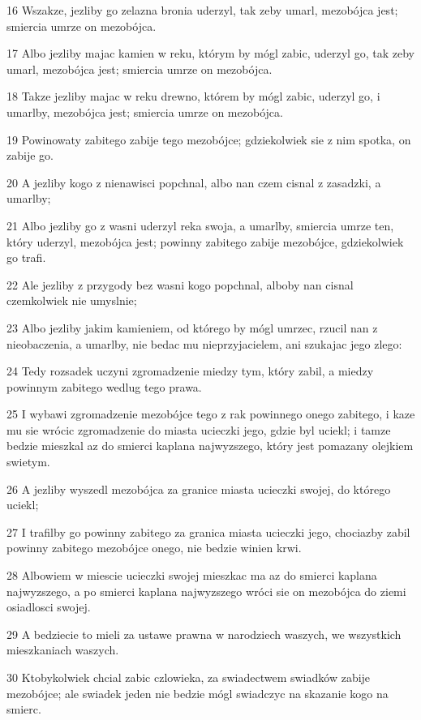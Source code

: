 \par 16 Wszakze, jezliby go zelazna bronia uderzyl, tak zeby umarl, mezobójca jest; smiercia umrze on mezobójca.
\par 17 Albo jezliby majac kamien w reku, którym by mógl zabic, uderzyl go, tak zeby umarl, mezobójca jest; smiercia umrze on mezobójca.
\par 18 Takze jezliby majac w reku drewno, którem by mógl zabic, uderzyl go, i umarlby, mezobójca jest; smiercia umrze on mezobójca.
\par 19 Powinowaty zabitego zabije tego mezobójce; gdziekolwiek sie z nim spotka, on zabije go.
\par 20 A jezliby kogo z nienawisci popchnal, albo nan czem cisnal z zasadzki, a umarlby;
\par 21 Albo jezliby go z wasni uderzyl reka swoja, a umarlby, smiercia umrze ten, który uderzyl, mezobójca jest; powinny zabitego zabije mezobójce, gdziekolwiek go trafi.
\par 22 Ale jezliby z przygody bez wasni kogo popchnal, alboby nan cisnal czemkolwiek nie umyslnie;
\par 23 Albo jezliby jakim kamieniem, od którego by mógl umrzec, rzucil nan z nieobaczenia, a umarlby, nie bedac mu nieprzyjacielem, ani szukajac jego zlego:
\par 24 Tedy rozsadek uczyni zgromadzenie miedzy tym, który zabil, a miedzy powinnym zabitego wedlug tego prawa.
\par 25 I wybawi zgromadzenie mezobójce tego z rak powinnego onego zabitego, i kaze mu sie wrócic zgromadzenie do miasta ucieczki jego, gdzie byl uciekl; i tamze bedzie mieszkal az do smierci kaplana najwyzszego, który jest pomazany olejkiem swietym.
\par 26 A jezliby wyszedl mezobójca za granice miasta ucieczki swojej, do którego uciekl;
\par 27 I trafilby go powinny zabitego za granica miasta ucieczki jego, chociazby zabil powinny zabitego mezobójce onego, nie bedzie winien krwi.
\par 28 Albowiem w miescie ucieczki swojej mieszkac ma az do smierci kaplana najwyzszego, a po smierci kaplana najwyzszego wróci sie on mezobójca do ziemi osiadlosci swojej.
\par 29 A bedziecie to mieli za ustawe prawna w narodziech waszych, we wszystkich mieszkaniach waszych.
\par 30 Ktobykolwiek chcial zabic czlowieka, za swiadectwem swiadków zabije mezobójce; ale swiadek jeden nie bedzie mógl swiadczyc na skazanie kogo na smierc.
